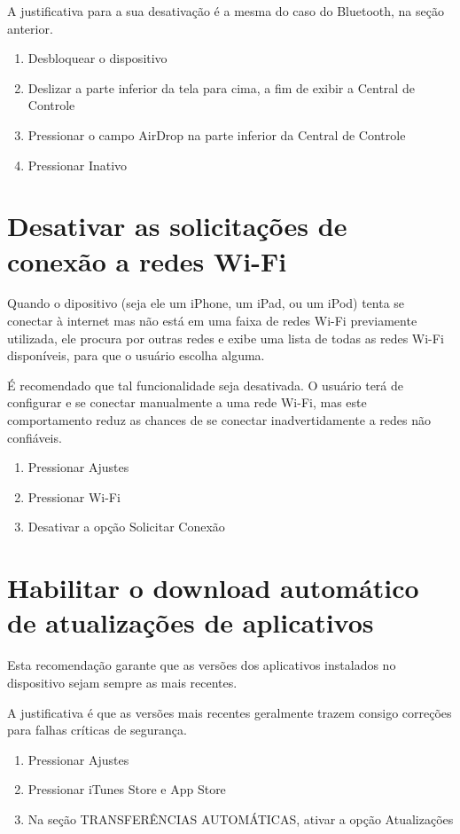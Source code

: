 A justificativa para a sua desativa\c c\~ao \'e a mesma do caso do Bluetooth, na se\c c\~ao anterior.

\begin{enumerate}
\item Desbloquear o dispositivo
\item Deslizar a parte inferior da tela para cima, a fim de exibir a Central de Controle
\item Pressionar o campo AirDrop na parte inferior da Central de Controle
\item Pressionar Inativo 
\end{enumerate}

\section{Desativar as solicita\c c\~oes de conex\~ao a redes Wi-Fi}

Quando o dipositivo (seja ele um iPhone, um iPad, ou um iPod) tenta se conectar \`a internet mas n\~ao est\'a em uma faixa de redes Wi-Fi previamente utilizada, ele procura por outras redes e exibe uma lista de todas as redes Wi-Fi dispon\'iveis, para que o usu\'ario escolha alguma.

\'E recomendado que tal funcionalidade seja desativada. O usu\'ario ter\'a de configurar e se conectar manualmente a uma rede Wi-Fi, mas este comportamento reduz as chances de se conectar inadvertidamente a redes n\~ao confi\'aveis.

\begin{enumerate}
\item Pressionar Ajustes
\item Pressionar Wi-Fi
\item Desativar a op\c c\~ao Solicitar Conex\~ao 
\end{enumerate}

\section{Habilitar o download autom\'atico de atualiza\c c\~oes de aplicativos}

Esta recomenda\c c\~ao garante que as vers\~oes dos aplicativos instalados no dispositivo sejam sempre as mais recentes. 

A justificativa \'e que as vers\~oes mais recentes geralmente trazem consigo corre\c c\~oes para falhas cr\'iticas de seguran\c ca. 

\begin{enumerate}
\item Pressionar Ajustes
\item Pressionar iTunes Store e App Store
\item Na se\c c\~ao TRANSFER\^ENCIAS AUTOM\'ATICAS, ativar a op\c c\~ao Atualiza\c c\~oes
\end{enumerate}

